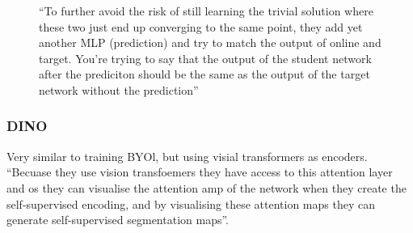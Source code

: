 \documentclass[11pt]{article}
\begin{document}
\begin{figure}[H]
    \centering
    \caption*{``To further avoid the risk of still learning the trivial solution where these two just end up converging to the same point, they add yet another MLP (prediction) and try to match the output of online and target. You're trying to say that the output of the student network after the prediciton should be the same as the output of the target network without the prediction''}
\end{figure}

\begin{figure}[H]
    \centering
    \caption*{}
\end{figure}

\subsubsection{DINO}

Very similar to training BYOl, but using visial transformers as encoders. ``Becuase they use vision transfoemers they have access to this attention layer and os they can visualise the attention amp of the network when they create the self-supervised encoding, and by visualising these attention maps they can generate self-supervised segmentation maps''.
\end{document}
